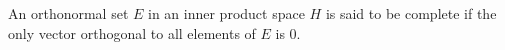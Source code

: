 An orthonormal set $E$ in an inner product space $H$ is said to be complete if the only vector orthogonal to all elements of $E$ is 0.
